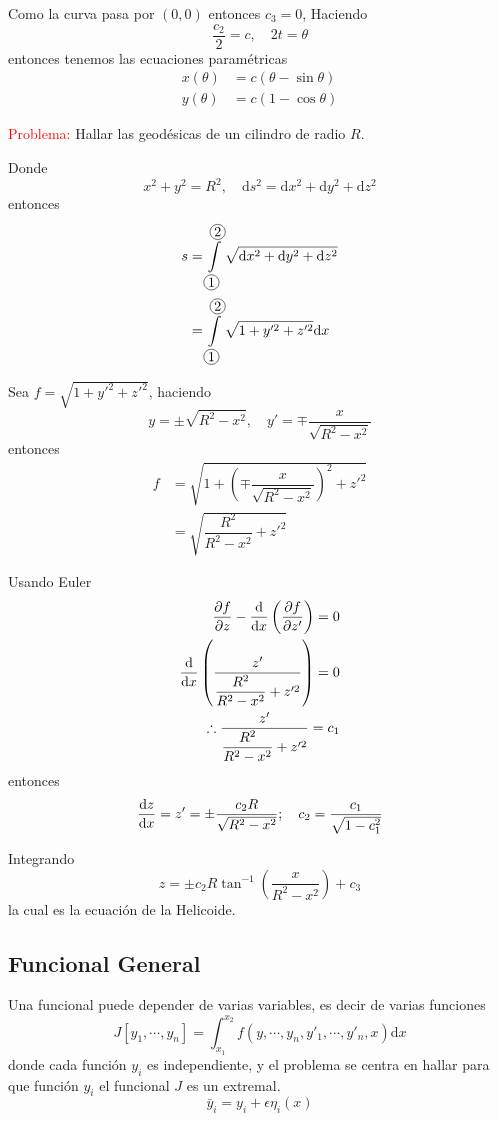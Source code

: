 \documentclass[../main]{subfiles}
\begin{document}
Como la curva pasa por $(0,0)$ entonces $c_3=0$, Haciendo
\begin{equation}
    \dfrac{c_2}{2}=c, \quad 2t=\theta
\end{equation}
entonces tenemos las ecuaciones paramétricas
\begin{align}
    x(\theta)&=c(\theta-\sin \theta)\\
    y(\theta)&=c(1-\cos \theta)
\end{align}

\textcolor{red}{Problema:} Hallar las geodésicas de un cilindro de radio $R$.

Donde
\begin{equation*}
    x^2+y^2=R^2, \quad \mathrm{d}s^2=\mathrm{d}x^2+\mathrm{d}y^2+\mathrm{d}z^2
\end{equation*}
entonces
\begin{align*}
    s&=\int\limits_{\circled{1}}^{\circled{2}} \sqrt{\mathrm{d}x^2+\mathrm{d}y^2+\mathrm{d}z^2}\\
    &=\int\limits_{\circled{1}}^{\circled{2}} \sqrt{1+y'^2+z'^2}\mathrm{d}x
\end{align*}

Sea $f=\sqrt{1+y'^2+z'^2}$, haciendo
\begin{equation*}
    y=\pm \sqrt{R^2-x^2}, \quad y'=\mp \dfrac{x}{\sqrt{R^2-x^2}}
\end{equation*}
entonces
\begin{align*}
    f&=\sqrt{1+\left(\mp \dfrac{x}{\sqrt{R^2-x^2}}\right)^2+z'^2}\\
    &=\sqrt{\dfrac{R^2}{R^2-x^2}+z'^2}
\end{align*}

Usando Euler
\begin{align*}
    \pdv{f}{z}-\dv{}{x}\left(\pdv{f}{z'}\right)=0\\
    \dv{}{x}\left(\dfrac{z'}{\dfrac{R^2}{R^2-x^2}+z'^2}\right)=0\\
    \therefore \dfrac{z'}{\dfrac{R^2}{R^2-x^2}+z'^2}=c_1
\end{align*}
entonces
\begin{equation*}
    \dv{z}{x}=z'=\pm \dfrac{c_2 R}{\sqrt{R^2-x^2}};\quad c_2=\dfrac{c_1}{\sqrt{1-c^2_1}}
\end{equation*}

Integrando
\begin{equation*}
    z=\pm c_2 R \tan^{-1}\left(\dfrac{x}{R^2-x^2}\right)+c_3
\end{equation*}
la cual es la ecuación de la Helicoide.
\subsection{Funcional General}
Una funcional puede depender de varias variables, es decir de varias funciones
\begin{equation}
    J[y_1, \cdots, y_n]=\int_{x_1}^{x_2} f(y, \cdots, y_n, y'_1, \cdots, y'_n, x)\mathrm{d}x
\end{equation}
donde cada función $y_i$ es independiente, y el problema se centra en hallar para que función $y_i$ el funcional $J$ es un extremal.
\begin{equation}
    \bar{y}_i=y_i+\epsilon \eta_i(x)
\end{equation}
\end{document}
